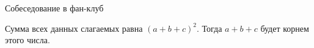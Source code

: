 \begin{tutorial}{Собеседование в фан-клуб}

Сумма всех данных слагаемых равна $(a + b + c)^2$. Тогда $a + b + c$ будет корнем этого числа.

\end{tutorial}
